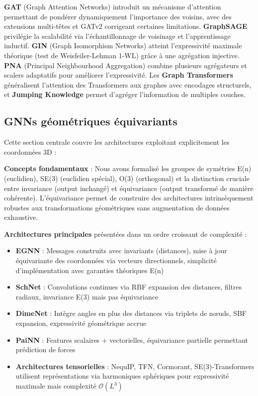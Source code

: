 \textbf{GAT} (Graph Attention Networks) introduit un mécanisme d'attention permettant de pondérer dynamiquement l'importance des voisins, avec des extensions multi-têtes et GATv2 corrigeant certaines limitations. \textbf{GraphSAGE} privilégie la scalabilité via l'échantillonnage de voisinage et l'apprentissage inductif. \textbf{GIN} (Graph Isomorphism Networks) atteint l'expressivité maximale théorique (test de Weisfeiler-Lehman 1-WL) grâce à une agrégation injective. \textbf{PNA} (Principal Neighbourhood Aggregation) combine plusieurs agrégateurs et scalers adaptatifs pour améliorer l'expressivité. Les \textbf{Graph Transformers} généralisent l'attention des Transformers aux graphes avec encodages structurels, et \textbf{Jumping Knowledge} permet d'agréger l'information de multiples couches.

\subsection*{GNNs géométriques équivariants}

Cette section centrale couvre les architectures exploitant explicitement les coordonnées 3D :

\textbf{Concepts fondamentaux} : Nous avons formalisé les groupes de symétries E(n) (euclidien), SE(3) (euclidien spécial), O(3) (orthogonal) et la distinction cruciale entre invariance (output inchangé) et équivariance (output transformé de manière cohérente). L'équivariance permet de construire des architectures intrinsèquement robustes aux transformations géométriques sans augmentation de données exhaustive.

\textbf{Architectures principales} présentées dans un ordre croissant de complexité :
\begin{itemize}
    \item \textbf{EGNN} : Messages construits avec invariants (distances), mise à jour équivariante des coordonnées via vecteurs directionnels, simplicité d'implémentation avec garanties théoriques E(n)
    \item \textbf{SchNet} : Convolutions continues via RBF expansion des distances, filtres radiaux, invariance E(3) mais pas équivariance
    \item \textbf{DimeNet} : Intègre angles en plus des distances via triplets de nœuds, SBF expansion, expressivité géométrique accrue
    \item \textbf{PaiNN} : Features scalaires + vectorielles, équivariance partielle permettant prédiction de forces
    \item \textbf{Architectures tensorielles} : NequIP, TFN, Cormorant, SE(3)-Transformers utilisent représentations via harmoniques sphériques pour expressivité maximale mais complexité $\mathcal{O}(L^3)$
\end{itemize}

